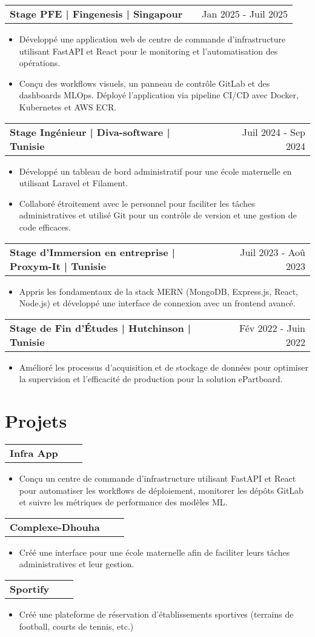 \documentclass[a4paper,11pt]{article}
\makeatletter
\newenvironment{jobshort}[2]
    {
    \begin{tabularx}{\linewidth}{@{}l X r@{}}
    \textbf{#1} & \hfill &  #2 \\[2.75pt]
    \end{tabularx}
    \begin{minipage}[t]{\linewidth}
    \begin{itemize}[nosep,after=\strut, leftmargin=1em, itemsep=2pt]
    }
    {
    \end{itemize}
    \end{minipage}
    }
\makeatother
\begin{document}
\begin{jobshort}{Stage PFE | Fingenesis | Singapour}{Jan 2025 - Juil 2025}
\item Développé une application web de centre de commande d'infrastructure utilisant FastAPI et React pour le monitoring et l'automatisation des opérations.
\item Conçu des workflows visuels, un panneau de contrôle GitLab et des dashboards MLOps. Déployé l'application via pipeline CI/CD avec Docker, Kubernetes et AWS ECR.
\end{jobshort}

\begin{jobshort}{Stage Ingénieur | Diva-software | Tunisie}{Juil 2024 - Sep 2024}
\item Développé un tableau de bord administratif pour une école maternelle en utilisant Laravel et Filament.
\item Collaboré étroitement avec le personnel pour faciliter les tâches administratives et utilisé Git pour un contrôle de version et une gestion de code efficaces.
\end{jobshort}

\begin{jobshort}{Stage d'Immersion en entreprise | Proxym-It | Tunisie}{Juil 2023 - Aoû 2023}
\item Appris les fondamentaux de la stack MERN (MongoDB, Express.js, React, Node.js) et développé une interface de connexion avec un frontend avancé.
\end{jobshort}

\begin{jobshort}{Stage de Fin d'Études | Hutchinson | Tunisie}{Fév 2022 - Juin 2022}
\item Amélioré les processus d'acquisition et de stockage de données pour optimiser la supervision et l'efficacité de production pour la solution ePartboard.
\end{jobshort}
  
\section{Projets}

\begin{jobshort}{Infra App}{}
\item Conçu un centre de commande d'infrastructure utilisant FastAPI et React pour automatiser les workflows de déploiement, monitorer les dépôts GitLab et suivre les métriques de performance des modèles ML.
\end{jobshort}
\vspace{-1pt}
\begin{jobshort}{Complexe-Dhouha}{}
\item Créé une interface pour une école maternelle afin de faciliter leurs tâches administratives et leur gestion.
\end{jobshort}
\vspace{-1pt}
\begin{jobshort}{Sportify}{}
\item Créé une plateforme de réservation d'établissements sportives (terrains de football, courts de tennis, etc.)
\end{jobshort}
\end{document}
